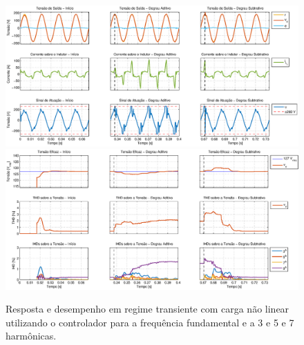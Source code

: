 \documentclass[repeatfields,oneside,overleaf]{tcc}
\begin{document}
\begin{figure}[h]
    \centering
    \caption{Resposta e desempenho em regime transiente com carga não linear utilizando o controlador para a frequência fundamental e a 3{\textordfeminine} e 5{\textordfeminine} e 7{\textordfeminine} harmônicas.}
    \includegraphics[trim={80 50 1 20}, clip, width=\linewidth]{fig/closed_7.eps}
    \\\vspace{0.475cm}
    \includegraphics[trim={80 20 1 20}, clip, width=\linewidth]{fig/harm_7.eps}
\end{figure}
\end{document}
